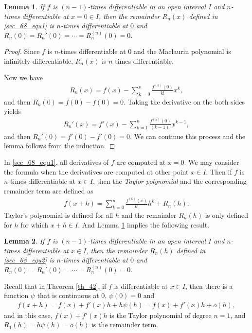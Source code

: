 \documentclass[11pt]{book}
\newtheorem{lemma}{Lemma}[chapter]
\theoremstyle{definition}
\numberwithin{equation}{chapter}
\begin{document}
\begin{lemma}\label{lemma_63}
If $f$ is $(n-1)$-times differentiable in an open interval $I$ and $n$-times differentiable at $x = 0 \in I$, then the remainder $R_n(x)$ defined in \eqref{sec_68_equ1} is $n$-times differentiable at $0$ and $R_n(0) = R_n'(0) = \cdots = R_n^{(n)}(0) = 0$.
\end{lemma}
\begin{proof}
Since $f$ is $n$-times differentiable at $0$ and the Maclaurin polynomial is infinitely differentiable, $R_n(x)$ is $n$-times differentiable. 

Now we have
\begin{align*}
    R_n(x) = f(x) - \sum^n_{k=0} \frac{f^{(k)}(0)}{k!} x^k,
\end{align*}
and then $R_n(0) = f(0) - f(0) = 0$. Taking the derivative on the both sides yields
\begin{align*}
    R_n'(x) = f'(x) - \sum^n_{k=1} \frac{f^{(k)}(0)}{(k-1)!} x^{k-1},
\end{align*}
and then $R_n'(0) = f'(0) - f'(0) = 0$. We can continue this process and the lemma follows from the induction.
\end{proof}

\medskip

In \eqref{sec_68_equ1}, all derivatives of $f$ are computed at $x = 0$. We may consider the formula when the derivatives are computed at other point $x \in I$. Then if $f$ is $n$-times differentiable at $x \in I$, then the {\em Taylor polynomial} and the corresponding remainder term are defined as
\begin{align}\label{sec_68_equ2}
    f(x + h) = \sum^n_{k=0} \frac{f^{(k)}(x)}{k!} h^k + R_n(h).
\end{align}
Taylor's polynomial is defined for all $h$ and the remainder $R_n(h)$ is only defined for $h$ for which $x + h \in I$. And Lemma \ref{lemma_63} implies the following result.

\medskip

\begin{lemma}\label{lemma_64}
If $f$ is $(n-1)$-times differentiable in an open interval $I$ and $n$-times differentiable at $x \in I$, then the remainder $R_n(h)$ defined in \eqref{sec_68_equ2} is $n$-times differentiable at $0$ and $R_n(0) = R_n'(0) = \cdots = R_n^{(n)}(0) = 0$.
\end{lemma}

\medskip

Recall that in Theorem \ref{th_42}, if $f$ is differentiable at $x \in I$, then there is a function $\psi$ that is continuous at $0$, $\psi(0) = 0$ and
\begin{align*}
    f(x + h) = f(x) + f'(x) h + h \psi(h) = f(x) + f'(x) h + o(h),
\end{align*}
and in this case, $f(x) + f'(x) h$ is the Taylor polynomial of degree $n = 1$, and $R_1(h) = h \psi(h) = o(h)$ is the remainder term.
\end{document}
